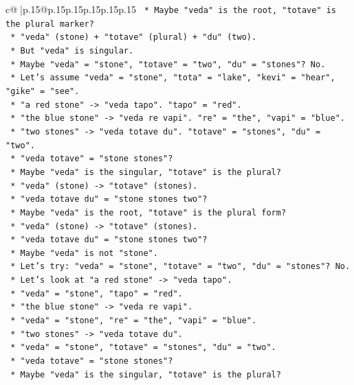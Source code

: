 \documentclass{article}
\begin{document}
{\begin{supertabular}{c@{$\;$}|p{.15\linewidth}@{}p{.15\linewidth}p{.15\linewidth}p{.15\linewidth}p{.15\linewidth}p{.15\linewidth}}
{{{\texttt{    *   Maybe "veda" is the root, "totave" is the plural marker?} \\
\texttt{    *   "veda" (stone) + "totave" (plural) + "du" (two).} \\
\texttt{    *   But "veda" is singular.} \\
\texttt{    *   Maybe "veda" = "stone", "totave" = "two", "du" = "stones"? No.} \\
\texttt{    *   Let's assume "veda" = "stone", "tota" = "lake", "kevi" = "hear", "gike" = "see".} \\
\texttt{    *   "a red stone" {-}> "veda tapo". "tapo" = "red".} \\
\texttt{    *   "the blue stone" {-}> "veda re vapi". "re" = "the", "vapi" = "blue".} \\
\texttt{    *   "two stones" {-}> "veda totave du". "totave" = "stones", "du" = "two".} \\
\texttt{    *   "veda totave" = "stone stones"?} \\
\texttt{    *   Maybe "veda" is the singular, "totave" is the plural?} \\
\texttt{    *   "veda" (stone) {-}> "totave" (stones).} \\
\texttt{    *   "veda totave du" = "stone stones two"?} \\
\texttt{    *   Maybe "veda" is the root, "totave" is the plural form?} \\
\texttt{    *   "veda" (stone) {-}> "totave" (stones).} \\
\texttt{    *   "veda totave du" = "stone stones two"?} \\
\texttt{    *   Maybe "veda" is not "stone".} \\
\texttt{    *   Let's try: "veda" = "stone", "totave" = "two", "du" = "stones"? No.} \\
\texttt{    *   Let's look at "a red stone" {-}> "veda tapo".} \\
\texttt{    *   "veda" = "stone", "tapo" = "red".} \\
\texttt{    *   "the blue stone" {-}> "veda re vapi".} \\
\texttt{    *   "veda" = "stone", "re" = "the", "vapi" = "blue".} \\
\texttt{    *   "two stones" {-}> "veda totave du".} \\
\texttt{    *   "veda" = "stone", "totave" = "stones", "du" = "two".} \\
\texttt{    *   "veda totave" = "stone stones"?} \\
\texttt{    *   Maybe "veda" is the singular, "totave" is the plural?} \\
}}}
\end{supertabular}}
\end{document}
